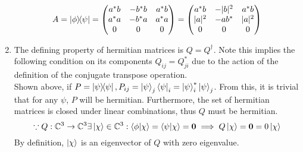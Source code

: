 \begin{sol}
\begin{enumerate}[label=\textbf{(\alph*)}]
$$A=\ketbra{\phi}{\psi}=\begin{pmatrix}
a^*b&-b^*b&a^*b\\
a^*a&-b^*a&a^*a\\
0&0&0 
\end{pmatrix}=\begin{pmatrix}
a^*b&-|b|^2&a^*b\\
|a|^2&-ab^*&|a|^2\\
0&0&0 
\end{pmatrix}$$
\item 
The defining property of hermitian matrices is $Q=Q^\dagger$. Note this implies the following condition on its components $Q_{ij}=Q_{ji}^*$ due to the action of the definition of the conjugate transpose operation.\\
Shown above, if $P=\ketbra{\psi}{\psi}, P_{ij}=\ket\psi_j\bra\psi_i=\ket\psi_i^*\ket\psi_j$. From this, it is trivial that for any $\psi$, $P$ will be hermitian. Furthermore, the set of hermitian matrices is closed under linear combinations, thus $Q$ must be hermitian.
$$\because Q:\mathbb C^3\to\mathbb C^3\exists\ket{\chi}\in\mathbb C^3:\braket{\phi}{\chi}=\braket{\psi}{\chi}=\mathbf 0\implies Q\ket{\chi}=\mathbf{0}=0\ket{\chi}$$  
By definition, $\ket{\chi}$ is an eigenvector of $Q$ with zero eigenvalue.
\end{enumerate}
\end{sol}
